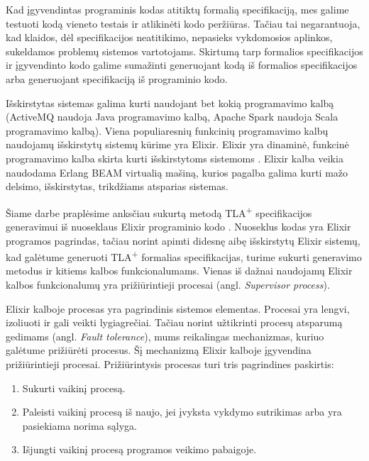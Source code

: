 \documentclass{VUMIFPSmagistrinis}
\begin{document}
        Kad įgyvendintas programinis kodas atitiktų formalią specifikaciją, mes galime testuoti kodą vieneto testais ir atlikinėti kodo peržiūras. Tačiau tai negarantuoja, kad klaidos, dėl specifikacijos
        neatitikimo, nepasieks vykdomosios aplinkos, sukeldamos problemų sistemos vartotojams.
        Skirtumą tarp formalios specifikacijos ir įgyvendinto kodo galime sumažinti generuojant kodą iš
        formalios specifikacijos arba generuojant specifikaciją iš programinio kodo. 

        Išskirstytas sistemas galima kurti naudojant bet kokią programavimo kalbą (ActiveMQ \cite{snyder2011activemq} naudoja Java programavimo kalbą, Apache Spark \cite{spark2018apache} naudoja Scala programavimo kalbą).
		Viena populiaresnių funkcinių programavimo kalbų naudojamų išskirstytų sistemų kūrime yra Elixir.
		Elixir yra dinaminė, funkcinė programavimo kalba skirta kurti išskirstytoms sistemoms \cite{juric2019elixir}.
		Elixir kalba veikia naudodama Erlang BEAM virtualią mašiną, kurios pagalba galima kurti mažo delsimo, išskirstytas, trikdžiams atsparias sistemas.
        
        Šiame darbe praplėsime anksčiau sukurtą metodą TLA\textsuperscript{+} specifikacijos generavimui iš nuoseklaus Elixir programinio kodo \cite{bravzenas2023tla+}. 
        Nuoseklus kodas yra Elixir programos pagrindas, tačiau norint apimti didesnę aibę išskirstytų
        Elixir sistemų, kad galėtume generuoti TLA\textsuperscript{+} formalias specifikacijas, turime sukurti generavimo metodus ir kitiems kalbos funkcionalumams.
        Vienas iš dažnai naudojamų Elixir kalbos funkcionalumų yra prižiūrintieji procesai (angl. {\it Supervisor process}).
        
        Elixir kalboje procesas yra pagrindinis sistemos elementas.
        Procesai yra lengvi, izoliuoti ir gali veikti lygiagrečiai.
        Tačiau norint užtikrinti procesų atsparumą gedimams (angl. {\it Fault tolerance}), mums reikalingas mechanizmas, kuriuo galėtume prižiūrėti procesus.
        Šį mechanizmą Elixir kalboje įgyvendina prižiūrintieji procesai.
        Prižiūrintysis procesas turi tris pagrindines paskirtis:
        \begin{enumerate}
            \item {Sukurti vaikinį procesą.}
            \item {Paleisti vaikinį procesą iš naujo, jei įvyksta vykdymo sutrikimas arba yra pasiekiama norima sąlyga.}
            \item {Išjungti vaikinį procesą programos veikimo pabaigoje.}
        \end{enumerate}
\end{document}
